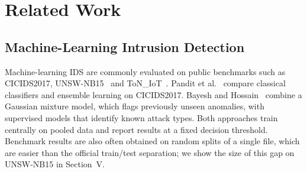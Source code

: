 
\section{Related Work}

\subsection{Machine-Learning Intrusion Detection}
Machine-learning IDS are commonly evaluated on public benchmarks such as
CICIDS2017, UNSW-NB15~\cite{moustafa2015unsw} and ToN\_IoT~\cite{ton_iot}.
Pandit et al.~\cite{pandit2023} compare classical classifiers and ensemble
learning on CICIDS2017. Bayesh and Hossain~\cite{bayesh2024} combine a
Gaussian mixture model, which flags previously unseen anomalies, with
supervised models that identify known attack types. Both approaches train
centrally on pooled data and report results at a fixed decision threshold.
Benchmark results are also often obtained on random splits of a single file,
which are easier than the official train/test separation; we show the size
of this gap on UNSW-NB15 in Section~V.

